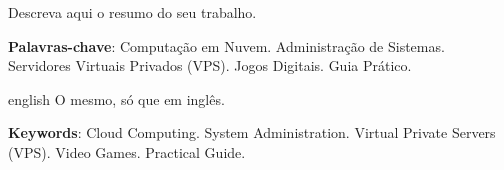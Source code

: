 
\setlength{\absparsep}{18pt} %
\begin{resumo}
 Descreva aqui o resumo do seu trabalho.
 
 \textbf{Palavras-chave}: Computação em Nuvem. Administração de Sistemas. Servidores Virtuais Privados (VPS). Jogos Digitais. Guia Prático.  
\end{resumo}

\begin{resumo}[Abstract]
 \begin{otherlanguage*}{english}
   O mesmo, só que em inglês.

   \vspace{\onelineskip}
 
   \noindent 
   \textbf{Keywords}: Cloud Computing. System Administration. Virtual Private Servers (VPS). Video Games. Practical Guide.
 \end{otherlanguage*}
\end{resumo}
